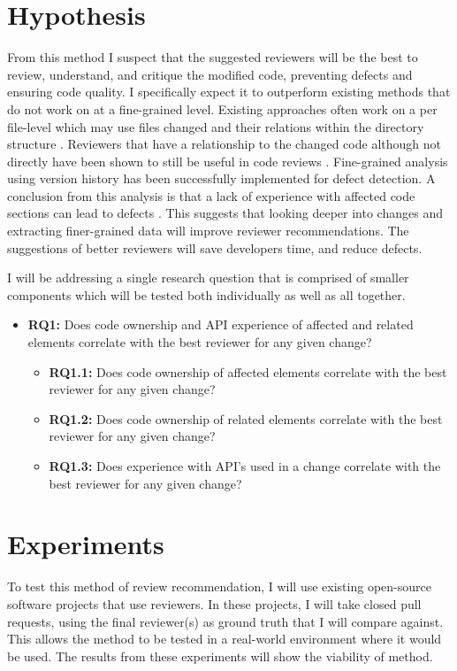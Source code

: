 \documentclass[conference]{ieee/IEEEtran}
\begin{document}
\section{Hypothesis}
From this method I suspect that the suggested reviewers will be the best to review, understand, and critique the modified code, preventing defects and ensuring code quality.
I specifically expect it to outperform existing methods that do not work on at a fine-grained level.
Existing approaches often work on a per file-level which may use files changed and their relations within the directory structure \cite{thongtanunam15}.
Reviewers that have a relationship to the changed code although not directly have been shown to still be useful in code reviews \cite{kovalenko18,thongtanunam16}.
Fine-grained analysis using version history has been successfully implemented for defect detection.
A conclusion from this analysis is that a lack of experience with affected code sections can lead to defects \cite{rahman11}.
This suggests that looking deeper into changes and extracting finer-grained data will improve reviewer recommendations.
The suggestions of better reviewers will save developers time, and reduce defects.

I will be addressing a single research question that is comprised of smaller components which will be tested both individually as well as all together.
\begin{itemize}
    \item \textbf{RQ1:} Does code ownership and API experience of affected and related elements correlate with the best reviewer for any given change?
        \begin{itemize}
            \item \textbf{RQ1.1:} Does code ownership of affected elements correlate with the best reviewer for any given change?
            \item \textbf{RQ1.2:} Does code ownership of related elements correlate with the best reviewer for any given change?
            \item \textbf{RQ1.3:} Does experience with API’s used in a change correlate with the best reviewer for any given change?
        \end{itemize}
\end{itemize}

\section{Experiments}
To test this method of review recommendation, I will use existing open-source software projects that use reviewers.
In these projects, I will take closed pull requests, using the final reviewer(s) as ground truth that I will compare against.
This allows the method to be tested in a real-world environment where it would be used.
The results from these experiments will show the viability of method.
\end{document}
